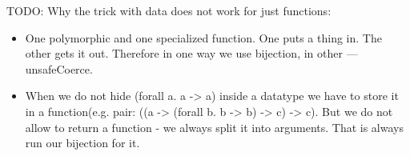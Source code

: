 TODO: Why the trick with data does not work for just functions:
\begin{itemize}
\item One polymorphic and one specialized function. One puts a thing in. The other
      gets it out. Therefore in one way we use bijection, in other --- unsafeCoerce.
\item When we do not hide (forall a. a -> a) inside a datatype we have to store it
      in a function(e.g. pair: ((a -> (forall b. b -> b) -> c) -> c). But we do not
      allow to return a function - we always split it into arguments. That is always
      run our bijection for it.
\end{itemize}

